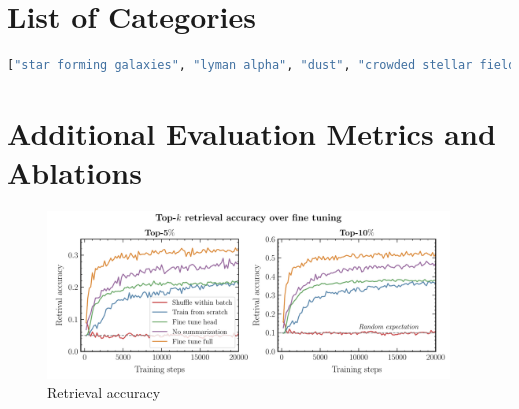 \documentclass[10pt]{article} %
\begin{document}
\section{List of Categories}
\label{app:categories}

\begin{lstlisting}[language=Python]
  ["star forming galaxies", "lyman alpha", "dust", "crowded stellar field", "core-collapse supernova", "cosmology", "gravitational lensing", "supernovae", "diffuse galaxies", "globular clusters", "stellar populations", "interstellar medium", "black holes", "dark matter", "galaxy clusters", "galaxy evolution", "galaxy formation", "quasars", "circumstellar disks", "exoplanets", "Kuiper Belt objects", "solar system objects", "cosmic web structure", "distant galaxies", "galaxy mergers", "galaxy interactions", "star formation", "stellar winds", "brown dwarfs", "white dwarfs", "nebulae", "star clusters", "galaxy archeology", "galactic structure", "active galactic nuclei", "gamma-ray bursts", "stellar nurseries", "intergalactic medium", "dark energy", "dwarf galaxies", "barred spiral galaxies", "irregular galaxies", "starburst galaxies", "low surface brightness galaxies", "ultra diffuse galaxies", "circumgalactic medium", "intracluster medium", "cosmic dust", "interstellar chemistry", "star formation histories", "initial mass function", "stellar proper motions", "binary star systems", "open clusters", "pre-main sequence stars", "protostars", "protoplanetary disks", "jets and outflows", "interstellar shocks", "planetary nebulae", "supernova remnants", "red giants", "Cepheid variables", "RR Lyrae variables", "stellar abundances", "stellar dynamics", "compact stellar remnants", "Einstein rings", "trans-Neptunian objects", "cosmic microwave background", "reionization epoch", "first stars", "first galaxies", "high-redshift quasars", "primordial black holes", "resolved binaries", "binary stars"]
\end{lstlisting}

\section{Additional Evaluation Metrics and Ablations}
\label{app:ablations}

\begin{figure}[!h]
\includegraphics[width=0.95\textwidth]{plots/retrieval_acc.pdf}
\caption{Retrieval accuracy}
\label{fig:retrieval_acc_supp}
\end{figure}
  
\end{document}
